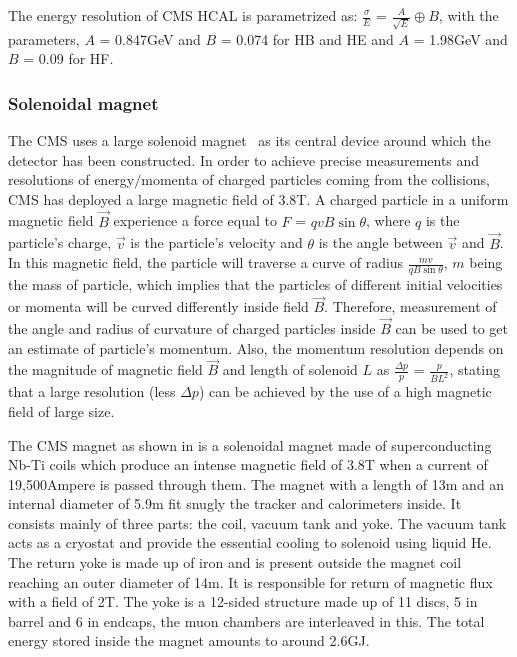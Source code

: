 The energy resolution of CMS HCAL is parametrized as: $\frac{\sigma}{E}$ = $\frac{A}{\sqrt{E}} \oplus B$,
with the parameters, $A$ = 0.847\unit{GeV} and $B$ = 0.074 for HB and HE and $A$ = 1.98\unit{GeV} and $B$ = 0.09 for HF.

\subsubsection{Solenoidal magnet}
The CMS uses a large solenoid magnet~\cite{cmsMagnet} as its central device around which the detector has been constructed. In order to achieve precise
measurements and resolutions of energy$/$momenta of charged particles coming from the collisions, CMS has deployed a large magnetic field of 3.8\unit{T}.
A charged particle in a uniform magnetic field $\vec{B}$ experience a force equal to $F$ = $qvB\sin{\theta}$, where $q$ is the particle's charge, $\vec{v}$ is
the particle's velocity and $\theta$ is the angle between $\vec{v}$ and $\vec{B}$.
In this magnetic field, the particle will traverse a curve of radius $\frac{mv}{qB\sin{\theta}}$, $m$ being
the mass of particle, which implies that the particles of different initial velocities or momenta will be curved differently inside field $\vec{B}$. Therefore,
measurement of the angle and radius of curvature of charged particles inside $\vec{B}$ can be used to get an estimate of particle's momentum. Also, the momentum resolution
depends on the magnitude of magnetic field $\vec{B}$ and length of solenoid $L$ as $\frac{\Delta{p}}{p}$ = $\frac{p}{BL^{2}}$, stating that a large
resolution (less $\Delta{p}$) can be achieved by the use of a high magnetic field of large size.  

The CMS magnet as shown in \fig{\ref{fig:Magnet}} is a solenoidal magnet made of superconducting Nb-Ti coils which produce an intense magnetic field of 3.8\unit{T} when
a current of 19,500\unit{Ampere} is passed through them.
The magnet with a length of 13\unit{m} and an internal diameter of 5.9\unit{m} fit snugly the tracker and calorimeters inside.
It consists mainly of three parts: the coil, vacuum tank and yoke. The vacuum tank acts as a cryostat and provide the essential cooling to solenoid using liquid He.
The return yoke is made up of iron and is present outside the magnet coil reaching an outer diameter of 14\unit{m}.
It is responsible for return of magnetic flux with a field of 2\unit{T}.
The yoke is a 12-sided structure made up of 11 discs, 5 in barrel and 6 in endcaps, the muon chambers are interleaved in this.
The total energy stored inside the magnet amounts to around 2.6\unit{GJ}.

